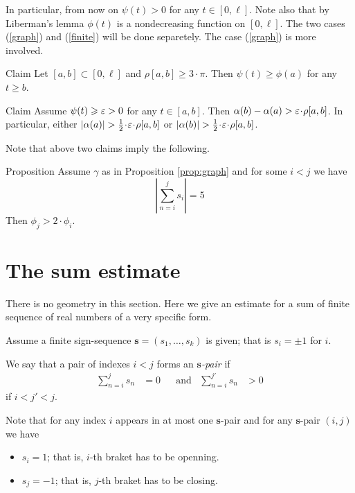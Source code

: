 \documentclass[a4paper,10pt]{amsart}
\begin{document}
In particular, from now on $\psi(t)>0$ for any $t\in[0,\ell]$.
Note also that by Liberman's lemma $\phi(t)$ is a nondecreasing function on $[0,\ell]$.
The two cases (\ref{graph}) and (\ref{finite}) will be done separetely.
The case (\ref{graph}) is more involved.

\begin{thm}{Claim}
Let $[a,b]\subset[0,\ell]$ and $\rho[a,b]\ge 3\cdot\pi$.
Then $\psi(t)\ge \phi(a)$ for any $t\ge b$.
\end{thm}


\begin{thm}{Claim}
Assume  
$\psi(t)\geqslant \varepsilon>0$ for any $t\in [a,b]$.
Then 
$\alpha(b)-\alpha(a)>\eps\cdot\rho[a,b]$.
In particular, either $|\alpha(a)|>\tfrac12\cdot\eps\cdot\rho[a,b]$ or $|\alpha(b)|>\tfrac12\cdot\eps\cdot\rho[a,b]$.
\end{thm}

Note that above two claims imply the following.

\begin{thm}{Proposition}
Assume $\gamma$ as in Proposition \ref{prop:graph}
and for some $i<j$ we have
\[\left|\sum_{n=i}^js_i\right|=5\]
Then $\phi_j>2\cdot\phi_i$.
\end{thm}



\section{The sum estimate}

There is no geometry in this section.
Here we give an estimate for a sum 
of finite sequence of real numbers 
of a very specific form.


Assume a finite  sign-sequence $\bm{s}=(s_1,\dots, s_k)$
is given;
that is $s_i=\pm1$ for $i$.

We say that a pair of indexes $i< j$
forms an \emph{$\bm{s}$-pair} 
if 
\begin{align*}
\sum_{n=i}^js_n&=0&&
\text{and}&
\sum_{n=i}^{j'}s_n&>0
\end{align*} 
if $i<j'<j$.

Note that for any index $i$ appears in at most one $\bm{s}$-pair and 
for any $\bm{s}$-pair $(i,j)$ we have
\begin{itemize}
\item $s_i=1$; that is, $i$-th braket has to be openning.
 \item $s_j=-1$; that is, $j$-th braket has to be closing.
\end{itemize}
\end{document}

